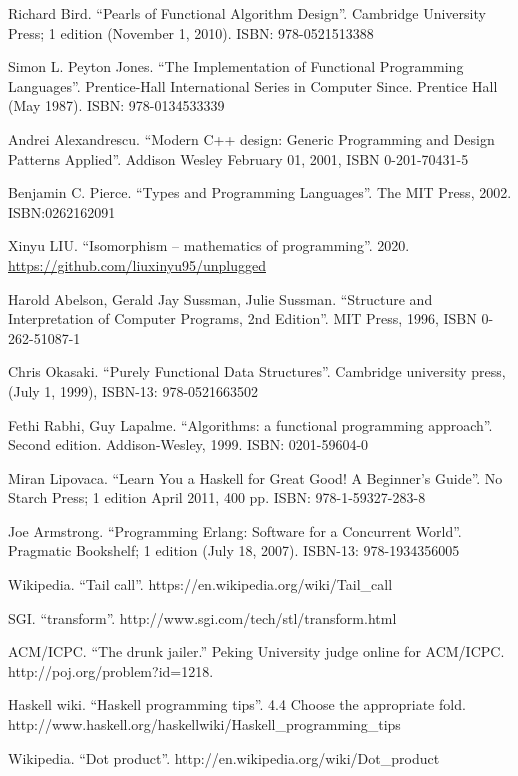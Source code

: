 \documentclass[b5paper]{article}
\begin{document}

\begin{thebibliography}{99}

Richard Bird. ``Pearls of Functional Algorithm Design''. Cambridge University Press; 1 edition (November 1, 2010). ISBN: 978-0521513388

Simon L. Peyton Jones. ``The Implementation of Functional Programming Languages''. Prentice-Hall International Series in Computer Since. Prentice Hall (May 1987). ISBN: 978-0134533339

Andrei Alexandrescu. ``Modern C++ design: Generic Programming and Design Patterns Applied''. Addison Wesley February 01, 2001, ISBN 0-201-70431-5

Benjamin C. Pierce. ``Types and Programming Languages''. The MIT Press, 2002. ISBN:0262162091

Xinyu LIU. ``Isomorphism -- mathematics of programming''. 2020. \url{https://github.com/liuxinyu95/unplugged}

Harold Abelson, Gerald Jay Sussman, Julie Sussman. ``Structure and Interpretation of Computer Programs, 2nd Edition''. MIT Press, 1996, ISBN 0-262-51087-1

Chris Okasaki. ``Purely Functional Data Structures''. Cambridge university press, (July 1, 1999), ISBN-13: 978-0521663502

Fethi Rabhi, Guy Lapalme. ``Algorithms: a functional programming approach''. Second edition. Addison-Wesley, 1999. ISBN: 0201-59604-0

Miran Lipovaca. ``Learn You a Haskell for Great Good! A Beginner's Guide''. No Starch Press; 1 edition April 2011, 400 pp. ISBN: 978-1-59327-283-8

Joe Armstrong. ``Programming Erlang: Software for a Concurrent World''. Pragmatic Bookshelf; 1 edition (July 18, 2007). ISBN-13: 978-1934356005

Wikipedia. ``Tail call''. https://en.wikipedia.org/wiki/Tail\_call

SGI. ``transform''. http://www.sgi.com/tech/stl/transform.html

ACM/ICPC. ``The drunk jailer.'' Peking University judge online for ACM/ICPC. http://poj.org/problem?id=1218.

Haskell wiki. ``Haskell programming tips''. 4.4 Choose the appropriate fold. http://www.haskell.org/haskellwiki/Haskell\_programming\_tips

Wikipedia. ``Dot product''. http://en.wikipedia.org/wiki/Dot\_product

\end{thebibliography}

\ifx\wholebook\relax \else
\end{document}
